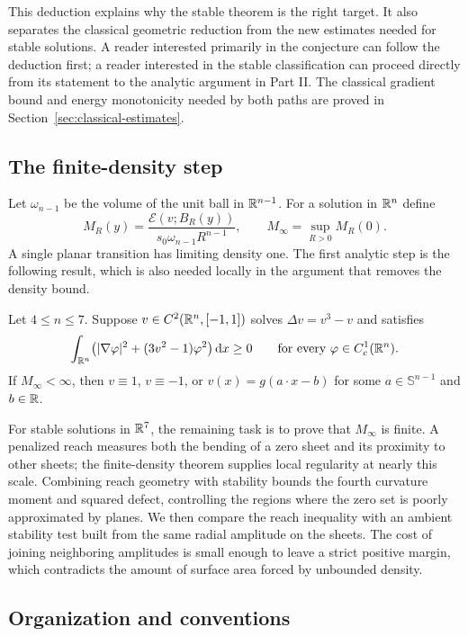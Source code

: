 This deduction explains why the stable theorem is the right target.
It also separates the classical geometric reduction from the new
estimates needed for stable solutions.  A reader interested primarily
in the conjecture can follow the deduction first; a reader interested
in the stable classification can proceed directly from its statement
to the analytic argument in Part II.
The classical gradient bound and energy monotonicity needed by both
paths are proved in Section~\ref{sec:classical-estimates}.

\subsection{The finite-density step}

Let $\omega_{n-1}$ be the volume of the unit ball in $\mathbb R^{n-1}$.
For a solution in $\mathbb R^n$ define
\[
 M_R(y)=\frac{\mathcal E(v;B_R(y))}
              {s_0\omega_{n-1}R^{n-1}},\qquad
 M_\infty=\sup_{R>0}M_R(0).
\]
A single planar transition has limiting density one.
The first analytic step is the following result, which is also
needed locally in the argument that removes the density bound.

\begin{theorem}\label{thm:finite}
Let $4\le n\le7$.  Suppose $v\in C^2(\mathbb R^n,[-1,1])$ solves
$\Delta v=v^3-v$ and satisfies
\[
 \int_{\mathbb R^n}\bigl(|\nabla\varphi|^2+(3v^2-1)\varphi^2\bigr)\,\mathrm d x
 \ge0
 \qquad\text{for every }\varphi\in C_c^1(\mathbb R^n).
\]
If $M_\infty<\infty$, then $v\equiv1$, $v\equiv-1$, or
$v(x)=g(a\cdot x-b)$ for some $a\in\mathbb S^{n-1}$ and $b\in\mathbb R$.
\end{theorem}

For stable solutions in $\mathbb R^7$, the remaining task is to prove that
$M_\infty$ is finite. A penalized reach measures both the bending of a
zero sheet and its proximity to other sheets; the finite-density theorem
supplies local regularity at nearly this scale. Combining reach geometry
with stability bounds the fourth curvature moment and squared defect,
controlling the regions where the zero set is poorly approximated by
planes. We then compare the reach inequality with an ambient stability
test built from the same radial amplitude on the sheets. The cost of
joining neighboring amplitudes is small enough to leave a strict positive
margin, which contradicts the amount of surface area forced by unbounded
density.

\subsection{Organization and conventions}

